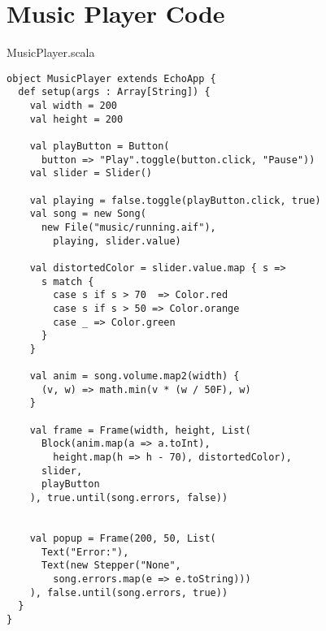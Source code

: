 \chapter{Music Player Code}

MusicPlayer.scala

\begin{verbatim}
object MusicPlayer extends EchoApp {
  def setup(args : Array[String]) {
    val width = 200
    val height = 200

    val playButton = Button(
      button => "Play".toggle(button.click, "Pause"))
    val slider = Slider()

    val playing = false.toggle(playButton.click, true)
    val song = new Song(
      new File("music/running.aif"), 
        playing, slider.value)

    val distortedColor = slider.value.map { s =>
      s match {
        case s if s > 70  => Color.red
        case s if s > 50 => Color.orange
        case _ => Color.green 
      }
    }

    val anim = song.volume.map2(width) {
      (v, w) => math.min(v * (w / 50F), w)
    }

    val frame = Frame(width, height, List(
      Block(anim.map(a => a.toInt), 
        height.map(h => h - 70), distortedColor),
      slider,
      playButton
    ), true.until(song.errors, false))


    val popup = Frame(200, 50, List(
      Text("Error:"),
      Text(new Stepper("None", 
        song.errors.map(e => e.toString)))
    ), false.until(song.errors, true))
  }
}
\end{verbatim}
